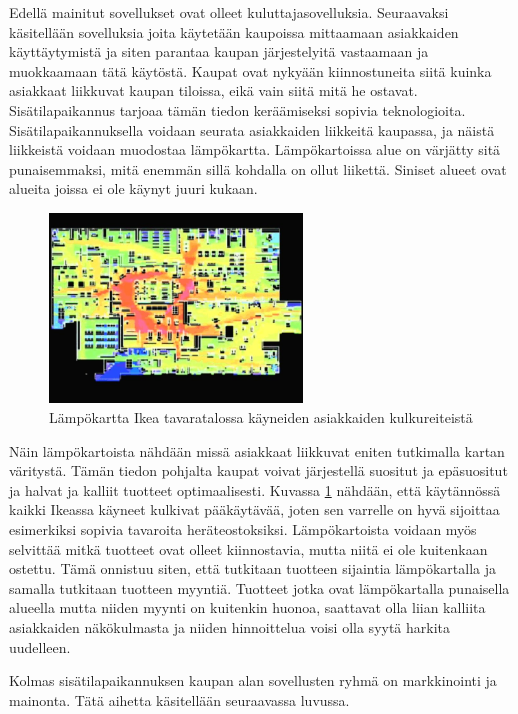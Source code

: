 Edellä mainitut sovellukset ovat olleet kuluttajasovelluksia. Seuraavaksi käsitellään sovelluksia joita käytetään kaupoissa mittaamaan asiakkaiden käyttäytymistä ja siten parantaa kaupan järjestelyitä vastaamaan ja muokkaamaan tätä käytöstä. Kaupat ovat nykyään kiinnostuneita siitä kuinka asiakkaat liikkuvat kaupan tiloissa, eikä vain siitä mitä he ostavat\cite{heat}. Sisätilapaikannus tarjoaa tämän tiedon keräämiseksi sopivia teknologioita. Sisätilapaikannuksella voidaan seurata asiakkaiden liikkeitä kaupassa, ja näistä liikkeistä voidaan muodostaa lämpökartta. Lämpökartoissa alue on värjätty sitä punaisemmaksi, mitä enemmän sillä kohdalla on ollut liikettä. Siniset alueet ovat alueita joissa ei ole käynyt juuri kukaan. 
\begin{figure}[htpb]
    \centering
    \includegraphics[width=0.6\textwidth]{ikeaheatmap.png}
    \caption{Lämpökartta Ikea tavaratalossa käyneiden asiakkaiden kulkureiteistä\cite{ikea}}
    \label{ikea}
\end{figure}
Näin lämpökartoista nähdään missä asiakkaat liikkuvat eniten tutkimalla kartan väritystä. Tämän tiedon pohjalta kaupat voivat järjestellä suositut ja epäsuositut ja halvat ja kalliit tuotteet optimaalisesti\cite{heat}.
Kuvassa \ref{ikea} nähdään, että käytännössä kaikki Ikeassa käyneet kulkivat pääkäytävää, joten sen varrelle on hyvä sijoittaa esimerkiksi sopivia tavaroita heräteostoksiksi.
Lämpökartoista voidaan myös selvittää mitkä tuotteet ovat olleet kiinnostavia, mutta niitä ei ole kuitenkaan ostettu. Tämä onnistuu siten, että tutkitaan tuotteen sijaintia lämpökartalla ja samalla tutkitaan tuotteen myyntiä. Tuotteet jotka ovat lämpökartalla punaisella alueella mutta niiden myynti on kuitenkin huonoa, saattavat olla liian kalliita asiakkaiden näkökulmasta ja niiden hinnoittelua voisi olla syytä harkita uudelleen.

Kolmas sisätilapaikannuksen kaupan alan sovellusten ryhmä on markkinointi ja mainonta. Tätä aihetta käsitellään seuraavassa luvussa.

